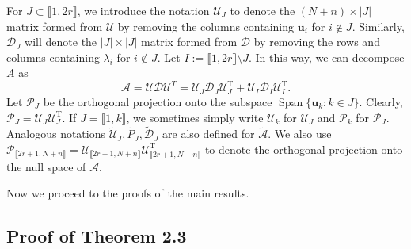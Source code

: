 \documentclass[reqno]{amsart}
\DeclareMathOperator{\Span}{Span}
\newcommand{\T}{\mathrm{T}}
\theoremstyle{plain}
\theoremstyle{definition}
\begin{document}
For $J \subset \llbracket 1, 2r\rrbracket$, we introduce the notation $\mathcal U_J$ to denote the $(N+n) \times |J|$ matrix formed from $\mathcal U$ by removing the columns containing ${\mathbf u}_i$ for $i \not\in J$.  Similarly, $\mathcal{D}_J$ will denote the $|J| \times |J|$ matrix formed from $\mathcal D$ by removing the rows and columns containing ${\lambda}_i$ for $i \not\in J$. Let $I:= \llbracket 1, 2r\rrbracket \setminus J$. In this way, we can decompose $A$ as
\begin{equation} \label{eq:Adecomp}
	\mathcal A = \mathcal U \mathcal D \mathcal U^T = {\mathcal U}_J {\mathcal D}_J {\mathcal U}_J^\T + {\mathcal U}_{I} {\mathcal D}_{I} {\mathcal U}_{I}^\T.   
\end{equation} 
Let $\mathcal P_{J}$ be the orthogonal projection onto the subspace $\Span\{\mathbf u_{k}: {k\in J}\}$. Clearly, $\mathcal P_J = \mathcal U_J \mathcal U_J^\T.$ If $J={\llbracket 1, k\rrbracket}$, we sometimes simply write $\mathcal U_{k}$ for $\mathcal U_J$ and $\mathcal P_k$ for $\mathcal P_J$.
Analogous notations $ \widetilde{\mathcal U}_J, \widetilde{P}_J, \widetilde{\mathcal D}_J$ are also defined for $\widetilde{\mathcal A}$. We also use ${\mathcal P}_{\llbracket 2r+1, N+n\rrbracket}={\mathcal U}_{\llbracket 2r+1, N+n\rrbracket} {\mathcal U}_{\llbracket 2r+1, N+n\rrbracket}^\T$ to denote the orthogonal projection onto the null space of $\mathcal A$.

Now we proceed to the proofs of the main results. 


\subsection{Proof of Theorem 2.3}
\end{document}
